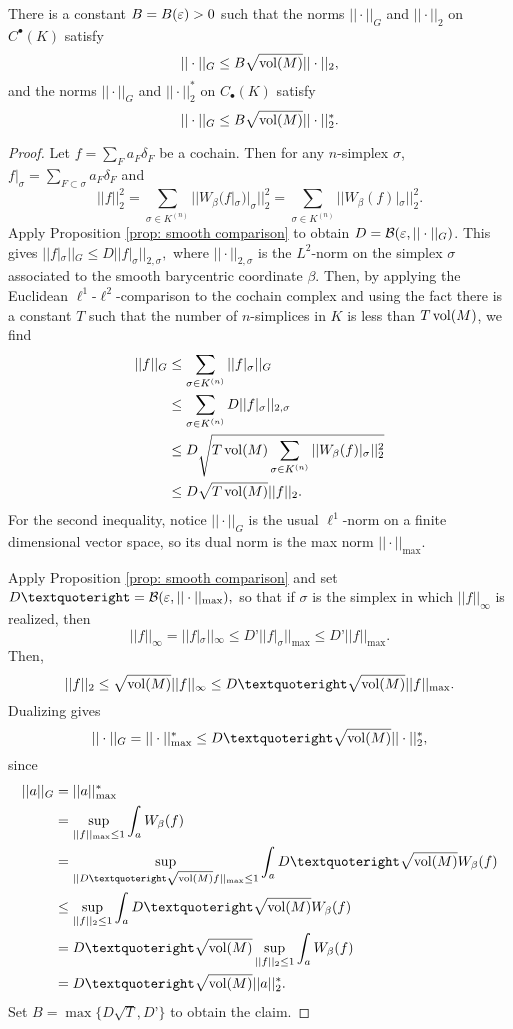 \begin{prop} \label{prop: 3.1} There is a constant $B =  B(\varepsilon)>0$ such that the norms $||\cdot||_G$ and $||\cdot||_2$ on $C^{\bullet}(K)$ satisfy $$||\cdot||_G\leq B\sqrt{\operatorname{vol}(M)}||\cdot||_2,$$ and the norms $||\cdot||_G$ and $||\cdot||_2^*$ on $C_{\bullet}(K)$ satisfy  $$||\cdot||_G\leq B \sqrt{\operatorname{vol}(M)}||\cdot||_2^{*}.$$
\end{prop}
\begin{proof}

 Let $f = \sum\limits_Fa_F\delta_F$ be a cochain.
 Then for any $n$-simplex $\sigma$, $f|_{\sigma} = \sum\limits_{F\subset \sigma}a_F\delta_F$ and $$||f||^2_2 = \sum\limits_{\sigma \in K^{(n)}} || W_{\beta}(f|_{\sigma})|_{\sigma}||_2^2 =\sum\limits_{\sigma \in K^{(n)}} ||W_{\beta}(f)|_{\sigma}||_2^2 .$$
Apply Proposition \ref{prop: smooth comparison} to obtain $D = \mathcal B(\varepsilon,||\cdot||_G)$. This gives $||f|_{\sigma}||_G\leq D ||f|_{\sigma}||_{2,\sigma},$ where $||\cdot||_{2,\sigma}$ is the $L^2$-norm on the simplex $\sigma$ associated to the smooth barycentric coordinate $\beta$.
Then, by applying the Euclidean $\ell^1$-$\ell^2$-comparison to the cochain complex and using the fact there is a constant $T$ such that the number of $n$-simplices in $K$ is less than $T\operatorname{vol}(M)$, we find
\begin{align*}
||f||_G  &\leq \sum\limits_{\sigma \in K^{(n)}} ||f|_{\sigma}||_G\\
		&\leq \sum\limits_{\sigma \in K^{(n)}}  D||f|_{\sigma}||_{2,\sigma}\\
	   &\leq D\sqrt{T\operatorname{vol}(M)\sum\limits_{\sigma \in K^{(n)}}||W_{\beta}(f)|_{\sigma}||_2^2}\\
	   &\leq D\sqrt{T\operatorname{vol}(M)}||f||_2.
\end{align*}
For the second inequality, notice $||\cdot||_G$ is the usual $\ell^1$-norm on a finite dimensional vector space, so its dual norm is the max norm $||\cdot||_{\max}$.
\color{black}

Apply Proposition \ref{prop: smooth comparison} and set $ D’ =\mathcal B(\e, ||\cdot||_{\max}),$ so that if $\sigma$ is the simplex in which $||f||_{\infty}$ is realized, then $$||f||_{\infty} = ||f|_{\sigma}||_{\infty}\leq  D’||f|_{\sigma}||_{\max}\leq D’||f||_{\max}.$$
Then, $$||f||_2 \leq\sqrt{\vol(M)} ||f||_{\infty} \leq D’ \sqrt{\vol(M)}||f||_{\max}.$$
Dualizing gives $$  ||\cdot||_G = ||\cdot||_{\max}^*\leq  D’ \sqrt{\vol(M)}||\cdot||_2^*,$$
since
\begin{align*}
	||a||_G &= ||a||_{\max}^*\\
		   &= \sup\limits_{||f||_{\max} \leq 1}\int_a W_{\beta}(f)\\
		   &=\sup\limits_{|| D’\sqrt{\vol(M)}f||_{\max} \leq 1}\int_{a} D’\sqrt{\vol(M)} W_{\beta} (f)\\
		   &\leq \sup\limits_{||f||_2\leq1}\int_{a} D’\sqrt{\vol(M)} W_{\beta} (f)\\
		   &=  D’\sqrt{\vol(M)} \sup\limits_{||f||_2\leq 1} \int_a W_{\beta} (f)\\
		   &= D’\sqrt{\vol(M)}||a||_2^*.
\end{align*}
Set $B = \max\{D\sqrt{T}, D’\}$ to obtain the claim.
 \end{proof}

